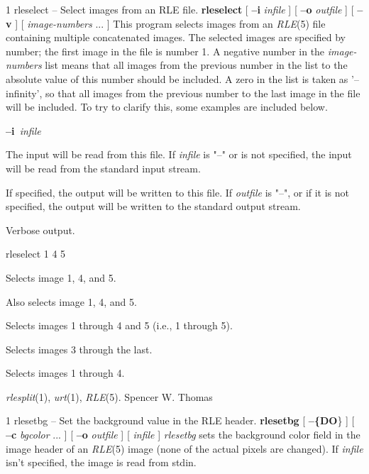 %
%
%
 1
rleselect -- Select images from an RLE file.
{\bf rleselect}
[
{\bf --i}
{\it infile} 
] [
{\bf --o} 
{\it outfile}
] [
{\bf --v}
] [ 
{\it image-numbers} ...
]
This program selects images from an
{\it RLE}{\rm (5)}
file containing multiple concatenated images.
The selected images are specified by number; the first image in the
file is number 1.  A negative number in the
{\it image-numbers}
list means that all images from the previous number in the list to the
absolute value of this number should be included.  A zero in the list
is taken as '--infinity', so that all images from the previous number
to the last image in the file will be included.  To try to clarify
this, some examples are included below.
\begin{TPlist}{{\bf --i}{\it \ infile}
}
\item[{{\bf --i}{\it \ infile}
}]
The input will be read from this file.  If
{\it infile}
is "--" or is not specified, the input will be read from the standard
input stream.
\item[{{\bf --o}{\it \ outfile}
}]
If specified, the output will be written to this file.  If 
{\it outfile}
is "--", or if it is not specified, the output will be written to the
standard output stream.
\item[{{\bf --v}}]
Verbose output.
\end{TPlist}
\begin{TPlist}{rleselect 1 4 5}
\item[{rleselect 1 4 5}]
Selects image 1, 4, and 5.
\item[{rleselect 4 1 5}]
Also selects image 1, 4, and 5.
\item[{rleselect 1 --4 5}]
Selects images 1 through 4 and 5 (i.e., 1 through 5).
\item[{rleselect 3 0}]
Selects images 3 through the last.
\item[{rleselect --4}]
Selects images 1 through 4.
\end{TPlist}
{\it rlesplit}{\rm (1),}
{\it urt}{\rm (1),}
{\it RLE}{\rm (5).}
Spencer W. Thomas
\newpage


%
%
%
 1
rlesetbg -- Set the background value in the RLE header.
{\bf rlesetbg}
[
{\bf --\{DO}\}
] [
{\bf --c}
{\it bgcolor} ...
] [
{\bf --o}
{\it outfile}
] [
{\it infile}
]
{\it rlesetbg}
sets the background color field in the image header of an
{\it RLE}{\rm (5)}
image (none of the actual
pixels are changed).  If 
{\it infile}
isn't specified, the image is read from stdin.  

